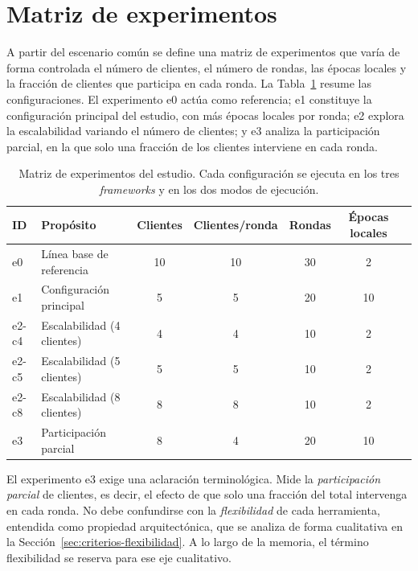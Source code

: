 \section{Matriz de experimentos}\label{sec:matriz-experimentos}

A partir del escenario común se define una matriz de experimentos que varía de forma controlada
el número de clientes, el número de rondas, las épocas locales y la fracción de clientes que
participa en cada ronda. La Tabla~\ref{tab:matriz-experimentos} resume las configuraciones. El
experimento e0 actúa como referencia; e1 constituye la configuración principal del estudio, con
más épocas locales por ronda; e2 explora la escalabilidad variando el número de clientes; y e3
analiza la participación parcial, en la que solo una fracción de los clientes interviene en cada
ronda.

\begin{table}[htbp]
  \centering
  \small
  \caption{Matriz de experimentos del estudio. Cada configuración se ejecuta en los tres
  \textit{frameworks} y en los dos modos de ejecución.}
  \label{tab:matriz-experimentos}
  \begin{tabular}{llccccc}
    \toprule
    ID & Propósito & Clientes & Clientes/ronda & Rondas & Épocas locales \\
    \midrule
    e0 & Línea base de referencia      & 10 & 10 & 30 & 2  \\
    e1 & Configuración principal       & 5  & 5  & 20 & 10 \\
    e2-c4 & Escalabilidad (4 clientes)    & 4  & 4  & 10 & 2  \\
    e2-c5 & Escalabilidad (5 clientes)    & 5  & 5  & 10 & 2  \\
    e2-c8 & Escalabilidad (8 clientes)    & 8  & 8  & 10 & 2  \\
    e3 & Participación parcial         & 8  & 4  & 20 & 10 \\
    \bottomrule
  \end{tabular}
\end{table}

El experimento e3 exige una aclaración terminológica. Mide la \textit{participación parcial}
de clientes, es decir, el efecto de que solo una fracción del total intervenga en cada ronda. No
debe confundirse con la \textit{flexibilidad} de cada herramienta, entendida como propiedad
arquitectónica, que se analiza de forma cualitativa en la Sección~\ref{sec:criterios-flexibilidad}.
A lo largo de la memoria, el término flexibilidad se reserva para ese eje cualitativo.

